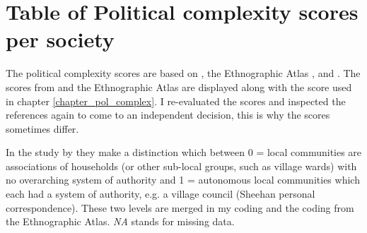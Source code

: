 \documentclass[draft,10pt]{article} %
\begin{document}
\section{Table of Political complexity scores per society}
\label{Pol_complex_table}
\singlespacing
The political complexity scores are based on \cite{sheehan2018coevolution}, the Ethnographic Atlas  \citep{d_place_all},\citet{bonnemaison1972systeme} and \cite{bonnemaison1996graded}. The scores from  \cite{sheehan2018coevolution} and the Ethnographic Atlas are displayed along with the score used in chapter \ref{chapter_pol_complex}. I re-evaluated the scores and inspected the references again to come to an independent decision, this is why the scores sometimes differ.

In the study by \cite{sheehan2018coevolution} they make a distinction which between 0 = local communities are associations of households (or other sub-local groups, such as village wards) with no overarching system of authority and 1 = autonomous local communities which each had a system of authority, e.g. a village council (Sheehan personal correspondence). These two levels are merged in my coding and the coding from the Ethnographic Atlas. \emph{NA} stands for missing data.
\end{document}
